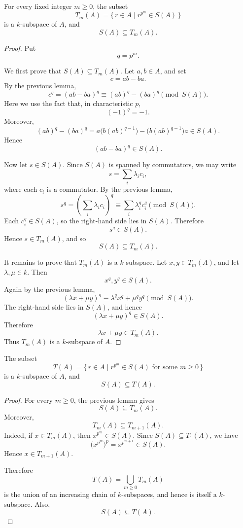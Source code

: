 \begin{lemma}
    For every fixed integer \(m\geq 0\), the subset
    \[
        T_m(A)=\{\,r\in A\mid r^{p^m}\in S(A)\,\}
    \]
    is a \(k\)-subspace of \(A\), and
    \[
        S(A)\subseteq T_m(A).
    \]
\end{lemma}

\begin{proof}
    Put
    \[
        q=p^m.
    \]

    We first prove that \(S(A)\subseteq T_m(A)\). Let \(a,b\in A\), and set
    \[
        c=ab-ba.
    \]
    By the previous lemma,
    \[
        c^q=(ab-ba)^q
        \equiv
        (ab)^q-(ba)^q
        \pmod{S(A)}.
    \]
    Here we use the fact that, in characteristic \(p\),
    \[
        (-1)^q=-1.
    \]
    Moreover,
    \[
        (ab)^q-(ba)^q
        =
        a\bigl(b(ab)^{q-1}\bigr)
        -
        \bigl(b(ab)^{q-1}\bigr)a
        \in S(A).
    \]
    Hence
    \[
        (ab-ba)^q\in S(A).
    \]

    Now let \(s\in S(A)\). Since \(S(A)\) is spanned by commutators, we may write
    \[
        s=\sum_i \lambda_i c_i,
    \]
    where each \(c_i\) is a commutator. By the previous lemma,
    \[
        s^q
        =
        \left(\sum_i\lambda_i c_i\right)^q
        \equiv
        \sum_i \lambda_i^q c_i^q
        \pmod{S(A)}.
    \]
    Each \(c_i^q\in S(A)\), so the right-hand side lies in \(S(A)\). Therefore
    \[
        s^q\in S(A).
    \]
    Hence \(s\in T_m(A)\), and so
    \[
        S(A)\subseteq T_m(A).
    \]

    It remains to prove that \(T_m(A)\) is a \(k\)-subspace. Let \(x,y\in T_m(A)\), and
    let \(\lambda,\mu\in k\). Then
    \[
        x^q,y^q\in S(A).
    \]
    Again by the previous lemma,
    \[
        (\lambda x+\mu y)^q
        \equiv
        \lambda^q x^q+\mu^q y^q
        \pmod{S(A)}.
    \]
    The right-hand side lies in \(S(A)\), and hence
    \[
        (\lambda x+\mu y)^q\in S(A).
    \]
    Therefore
    \[
        \lambda x+\mu y\in T_m(A).
    \]
    Thus \(T_m(A)\) is a \(k\)-subspace of \(A\).
\end{proof}

\begin{corollary}
    The subset
    \[
        T(A)=\{\,r\in A\mid r^{p^m}\in S(A)
        \text{ for some }m\geq 0\,\}
    \]
    is a \(k\)-subspace of \(A\), and
    \[
        S(A)\subseteq T(A).
    \]
\end{corollary}

\begin{proof}
    For every \(m\geq 0\), the previous lemma gives
    \[
        S(A)\subseteq T_m(A).
    \]
    Moreover,
    \[
        T_m(A)\subseteq T_{m+1}(A).
    \]
    Indeed, if \(x\in T_m(A)\), then \(x^{p^m}\in S(A)\). Since
    \(S(A)\subseteq T_1(A)\), we have
    \[
        \bigl(x^{p^m}\bigr)^p=x^{p^{m+1}}\in S(A).
    \]
    Hence \(x\in T_{m+1}(A)\).

    Therefore
    \[
        T(A)=\bigcup_{m\geq 0}T_m(A)
    \]
    is the union of an increasing chain of \(k\)-subspaces, and hence is itself a
    \(k\)-subspace. Also,
    \[
        S(A)\subseteq T(A).
    \]
\end{proof}

